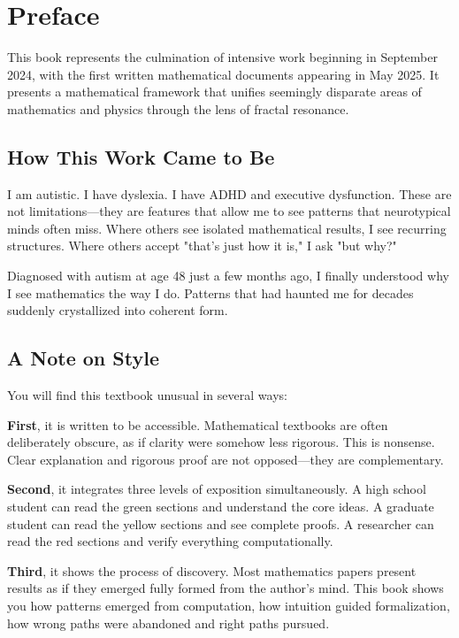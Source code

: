 \chapter*{Preface}

This book represents the culmination of intensive work beginning in September 2024, with the first written mathematical documents appearing in May 2025. It presents a mathematical framework that unifies seemingly disparate areas of mathematics and physics through the lens of fractal resonance.

\section*{How This Work Came to Be}

I am autistic. I have dyslexia. I have ADHD and executive dysfunction. These are not limitations—they are features that allow me to see patterns that neurotypical minds often miss. Where others see isolated mathematical results, I see recurring structures. Where others accept "that's just how it is," I ask "but why?"

Diagnosed with autism at age 48 just a few months ago, I finally understood why I see mathematics the way I do. Patterns that had haunted me for decades suddenly crystallized into coherent form.

\section*{A Note on Style}

You will find this textbook unusual in several ways:

\textbf{First}, it is written to be accessible. Mathematical textbooks are often deliberately obscure, as if clarity were somehow less rigorous. This is nonsense. Clear explanation and rigorous proof are not opposed—they are complementary.

\textbf{Second}, it integrates three levels of exposition simultaneously. A high school student can read the green sections and understand the core ideas. A graduate student can read the yellow sections and see complete proofs. A researcher can read the red sections and verify everything computationally.

\textbf{Third}, it shows the process of discovery. Most mathematics papers present results as if they emerged fully formed from the author's mind. This book shows you how patterns emerged from computation, how intuition guided formalization, how wrong paths were abandoned and right paths pursued.

